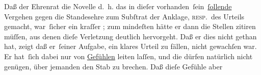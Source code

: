 \pstart
           Daß der Ehrenrat die Novelle d. h. das in dieſer
                  vorhanden ſein \uline{ſollende} Vergehen gegen die
               Standesehre zum Subſtrat der Anklage, \textsc{resp}. des Urteils
               gemacht, war ſicher ein kraſſer \label{K_L04321-3v}\label{K_L04321-3};
               zum mindeſten hätte er dann die Stellen zitiren müſſen, aus denen dieſe Verletzung
               deutlich hervorgeht. Daß er dies nicht gethan hat, zeigt {\pb}daß
               er ſeiner Aufgabe, ein klares Urteil zu fällen, nicht gewachſen war. Er hat ſich
               dabei nur von \uline{Gefühlen} leiten laſſen, und die dürfen
               natürlich nicht genügen, über jemanden den Stab zu brechen. Daß dieſe Gefühle aber
